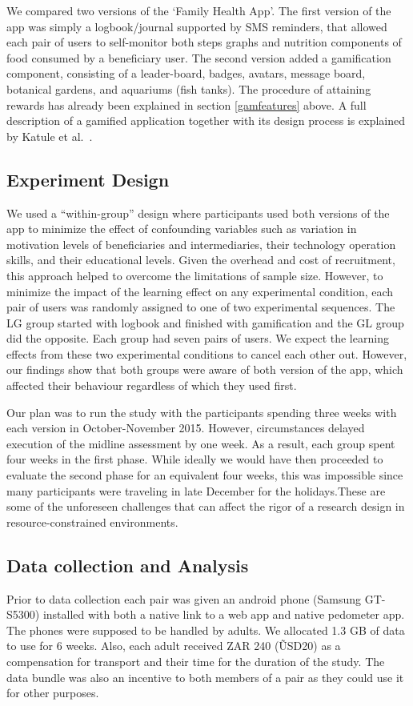 \documentclass{sig-alternate}
\begin{document}
We compared two versions of the `Family Health App'. The first version of the app was simply a logbook/journal supported by SMS reminders, that allowed each pair of users to self-monitor both steps graphs and nutrition components of food consumed by a beneficiary user. The second version added a gamification component, consisting of a leader-board, badges, avatars, message board, botanical gardens, and aquariums (fish tanks). The procedure of attaining rewards has already been explained in section \ref{gamfeatures} above. A full description of a gamified application together with its design process is explained by Katule et al.~\cite{katule2016:leveraging}.
\subsection{Experiment Design}
We used a ``within-group'' design where participants used both versions of the app to minimize the effect of confounding variables such as variation in motivation levels of beneficiaries and intermediaries, their technology operation skills, and their educational levels. Given the overhead and cost of recruitment, this approach helped to overcome the limitations of sample size. However, to minimize the impact of the learning effect on any experimental condition, each pair of users was randomly assigned to one of two experimental sequences. The LG group started with logbook and finished with gamification and the GL group did the opposite. Each group had seven pairs of users. We expect the learning effects from these two experimental conditions to cancel each other out.  However, our findings show that both groups were aware of both version of the app, which affected their behaviour regardless of which they used first. 

Our plan was to run the study with the participants spending three weeks with each version in October-November 2015. However, circumstances delayed execution of the midline assessment by one week. As a result, each group spent four weeks in the first phase.  While ideally we would have then proceeded to evaluate the second phase for an equivalent four weeks, this was impossible since many participants were traveling in late December for the holidays.These are some of the unforeseen challenges that can affect the rigor of a research design in resource-constrained environments.  

\subsection{Data collection and Analysis} 
Prior to data collection each pair was given an android phone (Samsung
GT-S5300) installed with both a native link to a web app and native pedometer app. The phones were supposed to be handled by adults. We allocated 1.3 GB of data to use for 6 weeks. Also, each adult received ZAR 240 (\~USD20) as a compensation for transport and their time for the duration of the study. The data bundle was also an incentive to both members of a pair as they could use it for other purposes. 
\end{document}
